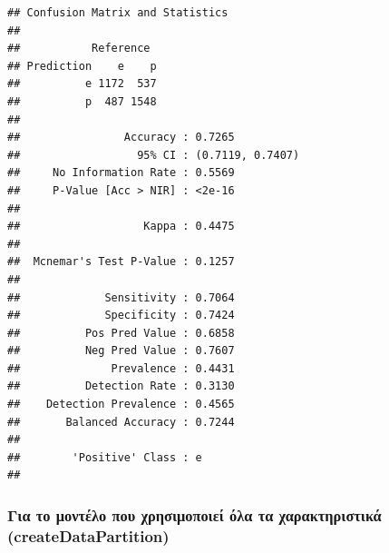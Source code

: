 \documentclass[
]{article}
\newenvironment{Shaded}{\begin{snugshade}}{\end{snugshade}}
\newcommand{\FunctionTok}[1]{\textcolor[rgb]{0.13,0.29,0.53}{\textbf{#1}}}
\newcommand{\NormalTok}[1]{#1}
\newcommand{\SpecialCharTok}[1]{\textcolor[rgb]{0.81,0.36,0.00}{\textbf{#1}}}
\begin{document}
\begin{verbatim}
## Confusion Matrix and Statistics
## 
##           Reference
## Prediction    e    p
##          e 1172  537
##          p  487 1548
##                                           
##                Accuracy : 0.7265          
##                  95% CI : (0.7119, 0.7407)
##     No Information Rate : 0.5569          
##     P-Value [Acc > NIR] : <2e-16          
##                                           
##                   Kappa : 0.4475          
##                                           
##  Mcnemar's Test P-Value : 0.1257          
##                                           
##             Sensitivity : 0.7064          
##             Specificity : 0.7424          
##          Pos Pred Value : 0.6858          
##          Neg Pred Value : 0.7607          
##              Prevalence : 0.4431          
##          Detection Rate : 0.3130          
##    Detection Prevalence : 0.4565          
##       Balanced Accuracy : 0.7244          
##                                           
##        'Positive' Class : e               
## 
\end{verbatim}

\subsubsection*{Για το μοντέλο που χρησιμοποιεί όλα τα χαρακτηριστικά
(createDataPartition)}\label{ux3b3ux3b9ux3b1-ux3c4ux3bf-ux3bcux3bfux3bdux3c4ux3adux3bbux3bf-ux3c0ux3bfux3c5-ux3c7ux3c1ux3b7ux3c3ux3b9ux3bcux3bfux3c0ux3bfux3b9ux3b5ux3af-ux3ccux3bbux3b1-ux3c4ux3b1-ux3c7ux3b1ux3c1ux3b1ux3baux3c4ux3b7ux3c1ux3b9ux3c3ux3c4ux3b9ux3baux3ac-createdatapartition}

\begin{Shaded}
\end{Shaded}
\end{document}

